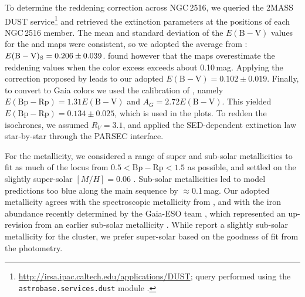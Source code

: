\documentclass[12pt,twocolumn,tighten]{aastex63}
\newcommand{\cn}{NGC\,2516} %
\begin{document}
To determine the reddening correction across \cn, we queried the 2MASS
DUST service\footnote{
  \url{http://irsa.ipac.caltech.edu/applications/DUST}; query
  performed using the \texttt{astrobase.services.dust} module
  \citep{bhatti_astrobase_2018}.  } and retrieved the extinction
parameters at the positions of each NGC\,2516 member.  The mean and
standard deviation of the $E(\mathrm{B}-\mathrm{V})$ values for the
\citet{schlegel_maps_1998} and \citet{schlafly_measuring_2011} maps
were consistent, so we adopted the average from
\citet{schlegel_maps_1998}: $E(\mathrm{B}-\mathrm{V})_{\rm
S}=0.206\pm0.039$.  \citet{bonifacio_search_2000} found however that
the \citet{schlegel_maps_1998} maps overestimate the reddening values
when the color excess exceeds about 0.10\,mag. Applying the correction
proposed by \citet{bonifacio_search_2000} leads to our adopted
$E(\mathrm{B}-\mathrm{V})=0.102\pm0.019$.  Finally, to convert to Gaia
colors we used the calibration of \citet{stassun_TIC8_2019}, namely
$E(\mathrm{Bp}-\mathrm{Rp})=1.31 E(\mathrm{B}-\mathrm{V})$ and
$A_G=2.72 E(\mathrm{B}-\mathrm{V})$.  This yielded
$E(\mathrm{Bp}-\mathrm{Rp})=0.134\pm0.025$, which is used in the
plots.  To redden the isochrones, we assumed $R_V=3.1$, and applied
the \citet{odonnell_1994} SED-dependent extinction law star-by-star
through the PARSEC interface. 

For the metallicity, we considered a range of super and sub-solar
metallicities to fit as much of the locus from
$0.5<\mathrm{Bp}-\mathrm{Rp}<1.5$ as possible, and settled on the
slightly super-solar $[M/H]=0.06$ \citep{cummings_2011_li_iron}.
Sub-solar metallicities led to model predictions too blue along the
main sequence by $\approx$0.1\,mag.  Our adopted metallicity agrees
with the spectroscopic metallicity from
\citet[][Sec~4.4.4]{cummings_2011_li_iron}, and with the iron
abundance recently determined by the Gaia-ESO team
\citep{baratella_gaiaeso_2020}, which represented an up-revision from
an earlier sub-solar metallicity \citep{randich_gaiaeso_2018}.  While
\citet{bailey_rv_2018} report a slightly sub-solar metallicity for the
cluster, we prefer super-solar based on the goodness of fit from the
photometry.
\end{document}
